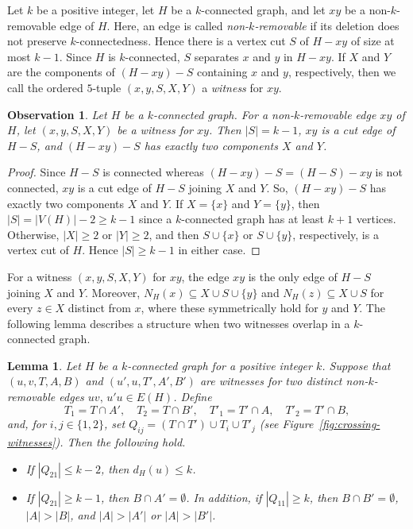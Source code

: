\documentclass[11pt]{article}
\numberwithin{equation}{section}
\newtheorem{lemma}[theorem]{Lemma}
\newtheorem{observation}[theorem]{Observation}
\begin{document}
Let $k$ be a positive integer, let $H$ be a $k$-connected graph, and let $xy$ be a non-$k$-removable edge of $H$.
Here, an edge is called \emph{non-$k$-removable} if its deletion does not preserve $k$-connectedness.
Hence there is a vertex cut $S$ of $H-xy$ of size at most $k-1$. 
Since $H$ is $k$-connected, $S$ separates $x$ and $y$ in $H-xy$.
If $X$ and $Y$ are the components of $(H-xy)-S$ containing $x$ and $y$, respectively, 
then we call the ordered $5$-tuple $(x,y,S,X,Y)$ a \emph{witness} for $xy$.

\begin{observation}\label{obs:witness}
    Let $H$ be a $k$-connected graph. 
    For a non-$k$-removable edge $xy$ of $H$, let $(x,y,S,X,Y)$ be a witness for $xy$. 
    Then $|S|=k-1$, $xy$ is a cut edge of $H-S$, and $(H-xy)-S$ has exactly two components $X$ and $Y$.
\end{observation}



\begin{proof}
Since $H-S$ is connected whereas $(H-xy)-S=(H-S)-xy$ is not connected, $xy$ is a cut edge of $H-S$ joining $X$ and $Y$.
So, $(H-xy)-S$ has exactly two components $X$ and $Y$. 
 If $X=\{x\}$ and $Y=\{y\}$, then $|S|=|V(H)|-2\ge k-1$ since a $k$-connected graph has at least $k+1$ vertices. 
Otherwise, $|X|\ge2$ or $|Y|\ge2$, and then $S\cup\{x\}$ or $S\cup\{y\}$, respectively, is a vertex cut of $H$.
Hence $|S|\ge k-1$ in either case.
\end{proof}



For a witness $(x,y,S,X,Y)$ for $xy$, the edge $xy$ is the only edge of $H-S$ joining $X$ and $Y$.
Moreover, $N_H(x)\subseteq X \cup S \cup \{y\}$ and $N_H(z)\subseteq X \cup S$ for every $z \in X$ distinct from $x$, where these symmetrically hold for $y$ and $Y$.
The following lemma describes a structure when two witnesses overlap in a $k$-connected graph. 


\begin{lemma}\label{lem:uncrossing}
Let $H$ be a $k$-connected graph for a positive integer $k$.
Suppose that $(u,v,T,A,B)$ and $(u',u,T',A',B')$ are witnesses for two distinct non-$k$-removable edges $uv,\,u'u\in E(H)$. 
Define
\[
  T_1=T\cap A',\quad T_2=T\cap B',\quad T'_1=T'\cap A,\quad T'_2=T'\cap B,
\]
and, for $i,j\in\{1,2\}$, set $Q_{ij}=(T\cap T')\cup T_i\cup T'_j$ (see
Figure~\ref{fig:crossing-witnesses}). 
Then the following hold.
\begin{itemize}
\item[(i)] If $|Q_{21}|\le k-2$, then $d_H(u)\le k$.
\item[(ii)] If $|Q_{21}|\ge k-1$, then $B\cap A'=\emptyset$. In addition, if $|Q_{11}|\ge k$, then $B\cap B'=\emptyset$, $|A|>|B|$, and $|A|>|A'|$ or $|A|>|B'|$.
\end{itemize}
\end{lemma}
\end{document}
